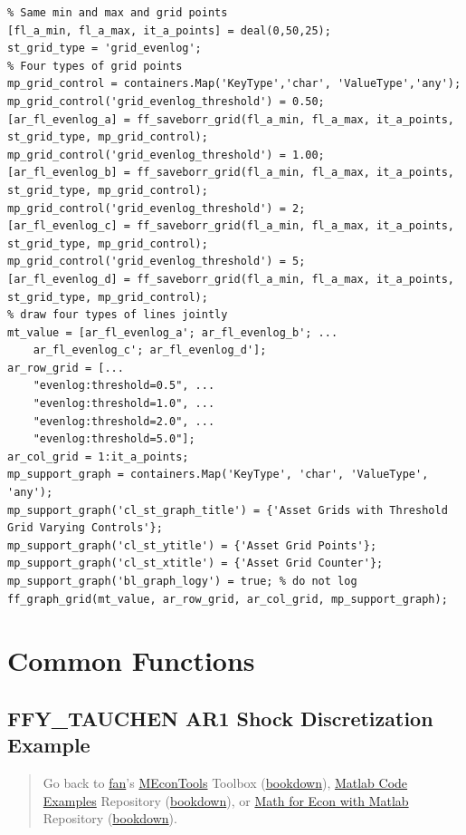 \documentclass[
]{book}
\begin{document}
\begin{verbatim}
% Same min and max and grid points
[fl_a_min, fl_a_max, it_a_points] = deal(0,50,25);
st_grid_type = 'grid_evenlog';
% Four types of grid points
mp_grid_control = containers.Map('KeyType','char', 'ValueType','any');
mp_grid_control('grid_evenlog_threshold') = 0.50;
[ar_fl_evenlog_a] = ff_saveborr_grid(fl_a_min, fl_a_max, it_a_points, st_grid_type, mp_grid_control);
mp_grid_control('grid_evenlog_threshold') = 1.00;
[ar_fl_evenlog_b] = ff_saveborr_grid(fl_a_min, fl_a_max, it_a_points, st_grid_type, mp_grid_control);
mp_grid_control('grid_evenlog_threshold') = 2;
[ar_fl_evenlog_c] = ff_saveborr_grid(fl_a_min, fl_a_max, it_a_points, st_grid_type, mp_grid_control);
mp_grid_control('grid_evenlog_threshold') = 5;
[ar_fl_evenlog_d] = ff_saveborr_grid(fl_a_min, fl_a_max, it_a_points, st_grid_type, mp_grid_control);
% draw four types of lines jointly
mt_value = [ar_fl_evenlog_a'; ar_fl_evenlog_b'; ...
    ar_fl_evenlog_c'; ar_fl_evenlog_d'];
ar_row_grid = [...
    "evenlog:threshold=0.5", ...
    "evenlog:threshold=1.0", ...
    "evenlog:threshold=2.0", ...
    "evenlog:threshold=5.0"];
ar_col_grid = 1:it_a_points;
mp_support_graph = containers.Map('KeyType', 'char', 'ValueType', 'any');
mp_support_graph('cl_st_graph_title') = {'Asset Grids with Threshold Grid Varying Controls'};
mp_support_graph('cl_st_ytitle') = {'Asset Grid Points'};
mp_support_graph('cl_st_xtitle') = {'Asset Grid Counter'};
mp_support_graph('bl_graph_logy') = true; % do not log
ff_graph_grid(mt_value, ar_row_grid, ar_col_grid, mp_support_graph);
\end{verbatim}

\hypertarget{common-functions}{%
\chapter{Common Functions}\label{common-functions}}

\hypertarget{ffy_tauchen-ar1-shock-discretization-example}{%
\section{FFY\_TAUCHEN AR1 Shock Discretization Example}\label{ffy_tauchen-ar1-shock-discretization-example}}

\begin{quote}
Go back to \href{http://fanwangecon.github.io/}{fan}'s \href{https://fanwangecon.github.io/MEconTools/}{MEconTools} Toolbox (\href{https://fanwangecon.github.io/MEconTools/bookdown}{bookdown}), \href{https://fanwangecon.github.io/M4Econ/}{Matlab Code Examples} Repository (\href{https://fanwangecon.github.io/M4Econ/bookdown}{bookdown}), or \href{https://fanwangecon.github.io/Math4Econ/}{Math for Econ with Matlab} Repository (\href{https://fanwangecon.github.io/Math4Econ/bookdown}{bookdown}).
\end{quote}
\end{document}
